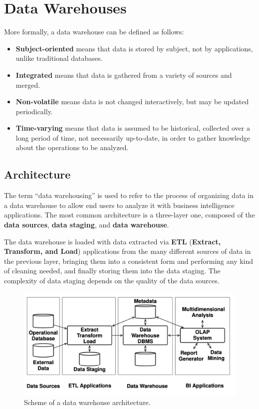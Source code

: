 \section{Data Warehouses}
More formally, a data warehouse can be defined as follows:
\begin{itemize}
    \item \textbf{Subject-oriented} means that data is stored by subject, not by applications, unlike traditional databases.
    
    \item \textbf{Integrated} means that data is gathered from a variety of sources and merged.
    
    \item \textbf{Non-volatile} means data is not changed interactively, but may be updated periodically.

    \item \textbf{Time-varying} means that data is assumed to be historical, collected over a long period of time, not necessarily up-to-date, in order to gather knowledge about the operations to be analyzed.
\end{itemize}

\subsection{Architecture}
The term ``data warehousing'' is used to refer to the process of organizing data in a data warehouse to allow end users to analyze it with business intelligence applications. The most common architecture is a three-layer one, composed of the \textbf{data sources}, \textbf{data staging}, and \textbf{data warehouse}.

The data warehouse is loaded with data extracted via \textbf{ETL} (\textbf{Extract, Transform, and Load}) applications from the many different sources of data in the previous layer, bringing them into a consistent form and performing any kind of cleaning needed, and finally storing them into the data staging. The complexity of data staging depends on the quality of the data sources.
\begin{figure}[ht]
    \centering
    \includegraphics[width=0.5\linewidth]{img/three_layer_architecture.png}
    \caption{Scheme of a data warehouse architecture.}
    \label{fig:enter-label}
\end{figure}

